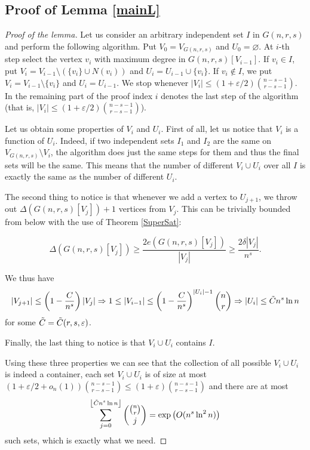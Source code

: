 \documentclass[10pt,a4paper]{article}
\theoremstyle{remark}
\theoremstyle{definition}
\newcommand{\skob}[1]{\left(#1\right)}
\newcommand{\flr}[1]{\left\lfloor#1\right\rfloor}
\begin{document}
\subsection{Proof of Lemma \ref{mainL}}

\begin{proof}[Proof of the lemma]
    Let us consider an arbitrary independent set $I$ in $G(n,r,s)$ and perform the following algorithm. Put $V_0 = V_{G(n,r,s)}$ and $U_0 = \varnothing$. At $i$-th step select the vertex $v_i$ with maximum degree in $G(n,r,s)[V_{i-1}]$. If $v_i \in I$, put $V_i = V_{i-1} \setminus (\{v_i\} \cup N(v_i))$ and $U_i = U_{i-1} \cup \{v_i\}$. If $v_i \notin I$, we put $V_i = V_{i-1} \setminus \{v_i\}$ and $U_i = U_{i-1}$. We stop whenever $|V_i| \leq (1+\varepsilon/2)\binom{n-s-1}{r-s-1}$. In the remaining part of the proof index $i$ denotes the last step of the algorithm (that is, $|V_i| \leq (1+\varepsilon/2)\binom{n-s-1}{r-s-1}$).

    Let us obtain some properties of $V_i$ and $U_i$. First of all, let us notice that $V_i$ is a function of $U_i$. Indeed, if two independent sets $I_1$ and $I_2$ are the same on $V_{G(n,r,s)} \setminus V_i$, the algorithm does just the same steps for them and thus the final sets will be the same. This means that the number of different $V_i \cup U_i$ over all $I$ is exactly the same as the number of different $U_i$. 

    The second thing to notice is that whenever we add a vertex to $U_{j+1}$, we throw out $\Delta(G(n,r,s)[V_j])+1$ vertices from $V_j$. This can be trivially bounded from below with the use of Theorem \ref{SuperSat}: 

    $$
        \Delta(G(n,r,s)[V_j]) \geq \frac{2e(G(n,r,s)[V_j])}{|V_j|} \geq \frac{2\delta|V_j|}{n^s}.
    $$

    We thus have 
    $$
    |V_{j+1}| \leq \skob{1-\frac{C}{n^s}}|V_j| \Rightarrow 1 \leq |V_{i-1}| \leq \skob{1-\frac{C}{n^s}}^{|U_i|-1}\binom{n}{r} \Rightarrow |U_i| \leq \Tilde{C}n^s\ln n
    $$
    for some $\Tilde{C} = \Tilde{C}(r,s,\varepsilon)$.

    Finally, the last thing to notice is that $V_i \cup U_i$ contains $I$.

    Using these three properties we can see that the collection of all possible $V_i \cup U_i$ is indeed a container, each set $V_i \cup U_i$ is of size at most $(1 + \varepsilon/2 + o_n(1))\binom{n-s-1}{r-s-1} \leq (1 + \varepsilon)\binom{n-s-1}{r-s-1}$ and there are at most 
    $$
        \sum_{j = 0}^{\flr{\Tilde{C}n^s\ln n}} \binom{\binom{n}{r}}{j} = \exp\skob{O(n^s\ln^2 n)}
    $$
    such sets, which is exactly what we need.
\end{proof}
\end{document}
